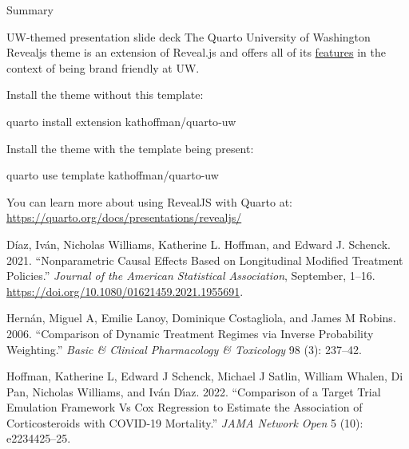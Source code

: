 \documentclass[
  10pt,
  ignorenonframetext,
]{beamer}
\newenvironment{Shaded}{\begin{snugshade}}{\end{snugshade}}
\newcommand{\ExtensionTok}[1]{\textcolor[rgb]{0.00,0.23,0.31}{#1}}
\newcommand{\NormalTok}[1]{\textcolor[rgb]{0.00,0.23,0.31}{#1}}
\newlength{\cslhangindent}
\newlength{\cslentryspacingunit} %
\newenvironment{CSLReferences}[2] %
 {%
  \setlength{\parindent}{0pt}
  \ifodd #1
  \let\oldpar\par
  \def\par{\hangindent=\cslhangindent\oldpar}
  \fi
  \setlength{\parskip}{#2\cslentryspacingunit}
 }%
 {}
\begin{document}
\begin{frame}[fragile]{Summary}
\protect\hypertarget{sec-summary}{}
\begin{block}{UW-themed presentation slide deck}
\protect\hypertarget{uw-themed-presentation-slide-deck}{}
The Quarto University of Washington Revealjs theme is an extension of
Reveal.js and offers all of its
\href{https://quarto.org/docs/presentations/revealjs/}{features} in the
context of being brand friendly at UW.

Install the theme without this template:

\begin{Shaded}
\begin{Highlighting}[]
\ExtensionTok{quarto}\NormalTok{ install extension kathoffman/quarto{-}uw}
\end{Highlighting}
\end{Shaded}

Install the theme with the template being present:

\begin{Shaded}
\begin{Highlighting}[]
\ExtensionTok{quarto}\NormalTok{ use template kathoffman/quarto{-}uw}
\end{Highlighting}
\end{Shaded}

You can learn more about using RevealJS with Quarto at:
\url{https://quarto.org/docs/presentations/revealjs/}

\hypertarget{refs}{}
\begin{CSLReferences}{1}{0}
\leavevmode{}%
Díaz, Iván, Nicholas Williams, Katherine L. Hoffman, and Edward J.
Schenck. 2021. {``Nonparametric {Causal} {Effects} {Based} on
{Longitudinal} {Modified} {Treatment} {Policies}.''} \emph{Journal of
the American Statistical Association}, September, 1--16.
\url{https://doi.org/10.1080/01621459.2021.1955691}.

\leavevmode{}%
Hernán, Miguel A, Emilie Lanoy, Dominique Costagliola, and James M
Robins. 2006. {``Comparison of Dynamic Treatment Regimes via Inverse
Probability Weighting.''} \emph{Basic \& Clinical Pharmacology \&
Toxicology} 98 (3): 237--42.

\leavevmode{}%
Hoffman, Katherine L, Edward J Schenck, Michael J Satlin, William
Whalen, Di Pan, Nicholas Williams, and Iván Dı́az. 2022. {``Comparison of
a Target Trial Emulation Framework Vs Cox Regression to Estimate the
Association of Corticosteroids with COVID-19 Mortality.''} \emph{JAMA
Network Open} 5 (10): e2234425--25.


\end{CSLReferences}
\end{block}
\end{frame}
\end{document}
